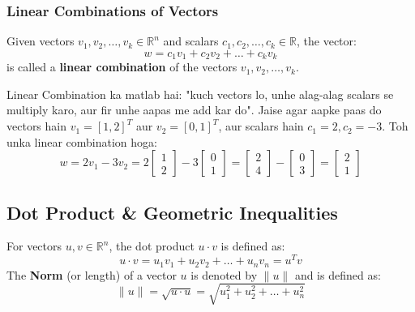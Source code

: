 \documentclass[11pt,a4paper]{article}
\begin{document}
\subsubsection{Linear Combinations of Vectors}
\begin{definitionbox}
Given vectors $v_1, v_2, \dots, v_k \in \mathbb{R}^n$ and scalars $c_1, c_2, \dots, c_k \in \mathbb{R}$, the vector:
\[ w = c_1 v_1 + c_2 v_2 + \dots + c_k v_k \]
is called a \textbf{linear combination} of the vectors $v_1, v_2, \dots, v_k$.
\end{definitionbox}

\begin{hinglishbox}
Linear Combination ka matlab hai: "kuch vectors lo, unhe alag-alag scalars se multiply karo, aur fir unhe aapas me add kar do".
Jaise agar aapke paas do vectors hain $v_1 = [1, 2]^T$ aur $v_2 = [0, 1]^T$, aur scalars hain $c_1 = 2, c_2 = -3$. 
Toh unka linear combination hoga:
\[ w = 2v_1 - 3v_2 = 2\begin{bmatrix}1\\2\end{bmatrix} - 3\begin{bmatrix}0\\1\end{bmatrix} = \begin{bmatrix}2\\4\end{bmatrix} - \begin{bmatrix}0\\3\end{bmatrix} = \begin{bmatrix}2\\1\end{bmatrix} \]
\end{hinglishbox}

\subsection{Dot Product \& Geometric Inequalities}

\begin{definitionbox}
For vectors $u, v \in \mathbb{R}^n$, the dot product $u \cdot v$ is defined as:
\[ u \cdot v = u_1 v_1 + u_2 v_2 + \dots + u_n v_n = u^T v \]
The \textbf{Norm} (or length) of a vector $u$ is denoted by $\|u\|$ and is defined as:
\[ \|u\| = \sqrt{u \cdot u} = \sqrt{u_1^2 + u_2^2 + \dots + u_n^2} \]
\end{definitionbox}
\end{document}

